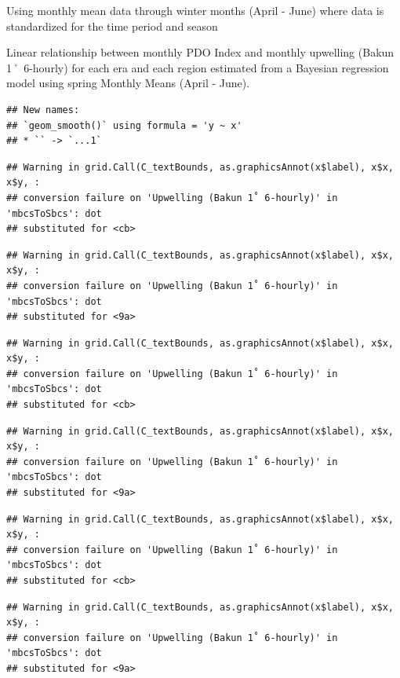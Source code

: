\documentclass[
]{article}
\begin{document}
Using monthly mean data through winter months (April - June) where data
is standardized for the time period and season

Linear relationship between monthly PDO Index and monthly upwelling
(Bakun 1˚ 6-hourly) for each era and each region estimated from a
Bayesian regression model using spring Monthly Means (April - June).

\begin{verbatim}
## New names:
## `geom_smooth()` using formula = 'y ~ x'
## * `` -> `...1`
\end{verbatim}

\begin{verbatim}
## Warning in grid.Call(C_textBounds, as.graphicsAnnot(x$label), x$x, x$y, :
## conversion failure on 'Upwelling (Bakun 1˚ 6-hourly)' in 'mbcsToSbcs': dot
## substituted for <cb>
\end{verbatim}

\begin{verbatim}
## Warning in grid.Call(C_textBounds, as.graphicsAnnot(x$label), x$x, x$y, :
## conversion failure on 'Upwelling (Bakun 1˚ 6-hourly)' in 'mbcsToSbcs': dot
## substituted for <9a>
\end{verbatim}

\begin{verbatim}
## Warning in grid.Call(C_textBounds, as.graphicsAnnot(x$label), x$x, x$y, :
## conversion failure on 'Upwelling (Bakun 1˚ 6-hourly)' in 'mbcsToSbcs': dot
## substituted for <cb>
\end{verbatim}

\begin{verbatim}
## Warning in grid.Call(C_textBounds, as.graphicsAnnot(x$label), x$x, x$y, :
## conversion failure on 'Upwelling (Bakun 1˚ 6-hourly)' in 'mbcsToSbcs': dot
## substituted for <9a>
\end{verbatim}

\begin{verbatim}
## Warning in grid.Call(C_textBounds, as.graphicsAnnot(x$label), x$x, x$y, :
## conversion failure on 'Upwelling (Bakun 1˚ 6-hourly)' in 'mbcsToSbcs': dot
## substituted for <cb>
\end{verbatim}

\begin{verbatim}
## Warning in grid.Call(C_textBounds, as.graphicsAnnot(x$label), x$x, x$y, :
## conversion failure on 'Upwelling (Bakun 1˚ 6-hourly)' in 'mbcsToSbcs': dot
## substituted for <9a>
\end{verbatim}
\end{document}
